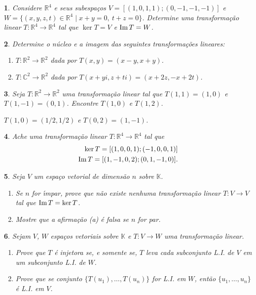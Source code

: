 \documentclass[12pt]{exam}
\newtheorem{exercicio}{}
\newcommand{\im}{{\rm Im\,}}
\newcommand{\real}{\mathbb{R}}
\newcommand{\complex}{\mathbb{C}}
\newcommand{\cp}[1]{\mathbb{#1}}
\begin{document}
\begin{exercicio}
  Considere $\real^4$ e seus subespa\c{c}os $V = [(1,0,1,1);(0,-1,-1,-1)]$ e $W = \{(x,y,z,t) \in \real^4 \mid x + y = 0,\ t + z = 0\}$. Determine uma transforma\c{c}\~ao linear $T : \real^4 \to \real^4$ tal que $\ker T = V$ e $\im T = W$.
\end{exercicio}

\begin{exercicio}
  Determine o n\'ucleo e a imagem das seguintes transforma\c{c}\~oes lineares:
  \begin{enumerate}[label=({\alph*})]
    \item $T : \real^2 \to \real^2$ dada por $T(x,y) = (x - y, x + y)$.
    \item $T : \complex^2 \to \real^2$ dada por $T(x + yi,z + ti) = (x + 2z, -x + 2t)$.
  \end{enumerate}
\end{exercicio}

\begin{exercicio}
  Seja $T : \real^2 \to \real^2$ uma transforma\c{c}\~ao linear tal que $T(1,1) = (1,0)$ e $T(1,-1) = (0,1)$. Encontre $T(1,0)$ e $T(1,2)$.
  \begin{solucao}
    $T(1,0) = (1/2,1/2)$ e $T(0,2) = (1,-1)$.
  \end{solucao}
\end{exercicio}

\begin{exercicio}
  Ache uma transforma\c{c}\~ao linear $T : \real^4 \to \real^4$ tal que
  \begin{align*}
    \ker T = [(1,0,0,1);(-1,0,0,1)]\\
    \im T = [(1,-1,0,2);(0,1,-1,0)].
  \end{align*}
\end{exercicio}

\begin{exercicio}
  Seja $V$ um espa\c{c}o vetorial de dimens\~ao $n$ sobre $\cp{K}$.
  \begin{enumerate}[label=({\alph*})]
    \item Se $n$ for {\'\i}mpar, prove que n\~ao existe nenhuma transforma\c{c}\~ao linear $T : V \to V$ tal que $\im T = \ker T$.
    \item Mostre que a afirma\c{c}\~ao (a) \'e falsa se $n$ for par.
  \end{enumerate}
\end{exercicio}

\begin{exercicio}
  Sejam $V$, $W$ espa\c{c}os vetoriais sobre $\cp{K}$ e $T : V \to W$ uma transforma\c{c}\~ao linear.
  \begin{enumerate}[label=({\alph*})]
    \item Prove que $T$ \'e injetora se, e somente se, $T$ leva cada subconjunto L.I. de $V$ em um subconjunto L.I. de $W$.
    \item Prove que se  conjunto $\{T(u_1),\dots,T(u_n)\}$ for L.I. em $W$, ent\~ao $\{u_1,\dots,u_n\}$ \'e L.I. em $V$.
  \end{enumerate}
\end{exercicio}
\end{document}
